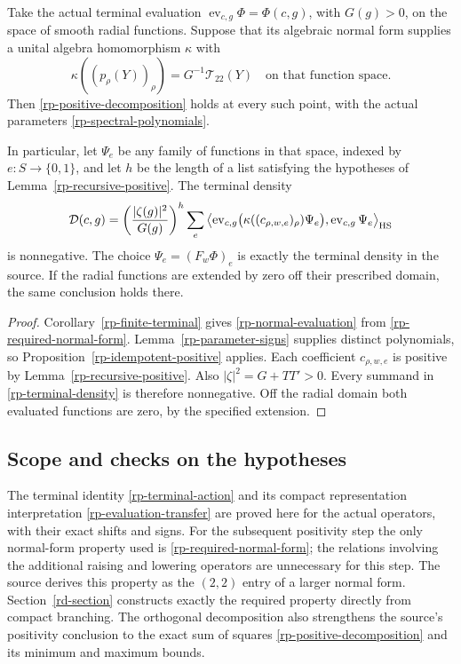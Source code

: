 \begin{corollary}\label{rp-terminal-density-positive}
Take the actual terminal evaluation
$\operatorname{ev}_{c,g}\Phi=\Phi(c,g)$, with
$G(g)>0$, on the space of smooth radial functions.
Suppose that its algebraic normal form supplies a
unital algebra homomorphism $\kappa$ with
\begin{equation}\label{rp-required-normal-form}
 \kappa((p_\rho(Y))_\rho)=G^{-1}\mathcal T_{22}(Y)
                         \quad\text{on that function space}.
\end{equation}
Then \eqref{rp-positive-decomposition} holds at every
such point, with the actual parameters
\eqref{rp-spectral-polynomials}.

In particular, let $\Psi_e$ be any family of functions
in that space, indexed by $e:S\to\{0,1\}$, and let
$h$ be the length of a list satisfying the hypotheses
of Lemma~\ref{rp-recursive-positive}.  The terminal
density
\begin{equation}\label{rp-terminal-density}
 \mathcal D(c,g)=
  \left(\frac{|\zeta(g)|^2}{G(g)}\right)^h
  \sum_e\left\langle
    \operatorname{ev}_{c,g}
       \bigl(\kappa((c_{\rho,w,e})_\rho)\Psi_e\bigr),
            \operatorname{ev}_{c,g}\Psi_e\right\rangle_{\rm HS}
\end{equation}
is nonnegative.  The choice $\Psi_e=(F_w\Phi)_e$
is exactly the terminal density in the source.
If the radial functions are extended by zero off their
prescribed domain, the same conclusion holds there.
\end{corollary}

\begin{proof}
Corollary~\ref{rp-finite-terminal} gives
\eqref{rp-normal-evaluation} from
\eqref{rp-required-normal-form}.
Lemma~\ref{rp-parameter-signs} supplies distinct
polynomials, so Proposition~\ref{rp-idempotent-positive}
applies.  Each coefficient $c_{\rho,w,e}$ is positive
by Lemma~\ref{rp-recursive-positive}.
Also $|\zeta|^2=G+TT'>0$.  Every summand in
\eqref{rp-terminal-density} is therefore nonnegative.
Off the radial domain both evaluated functions are
zero, by the specified extension.
\end{proof}

\subsection{Scope and checks on the hypotheses}

The terminal identity
\eqref{rp-terminal-action} and its compact
representation interpretation
\eqref{rp-evaluation-transfer} are proved here for
the actual operators, with their exact shifts and signs.
For the subsequent positivity step the only normal-form
property used is \eqref{rp-required-normal-form};
the relations involving the additional raising and
lowering operators are unnecessary for this step.
The source derives this property as the $(2,2)$ entry
of a larger normal form.  Section~\ref{rd-section}
constructs exactly the required property directly
from compact branching.  The orthogonal decomposition
also strengthens the source's positivity conclusion to
the exact sum of squares \eqref{rp-positive-decomposition}
and its minimum and maximum bounds.

